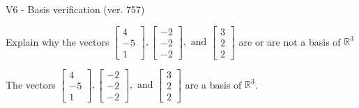 \begin{exercise}
  \begin{exerciseTitle}V6 - Basis verification (ver. 757)\end{exerciseTitle}
  \begin{exerciseStatement}
    Explain why the vectors \(\left[\begin{array}{r}
4 \\
-5 \\
1
\end{array}\right] , \left[\begin{array}{r}
-2 \\
-2 \\
-2
\end{array}\right] , \text{ and } \left[\begin{array}{r}
3 \\
2 \\
2
\end{array}\right]\) are or are not a basis of \(\mathbb{R}^3\)	


  \end{exerciseStatement}
  \begin{exerciseAnswer}
   The vectors \(\left[\begin{array}{r}
4 \\
-5 \\
1
\end{array}\right] , \left[\begin{array}{r}
-2 \\
-2 \\
-2
\end{array}\right] , \text{ and } \left[\begin{array}{r}
3 \\
2 \\
2
\end{array}\right]\) 
  	 are  a basis of \(\mathbb{R}^3\).
  


  \end{exerciseAnswer}
\end{exercise}